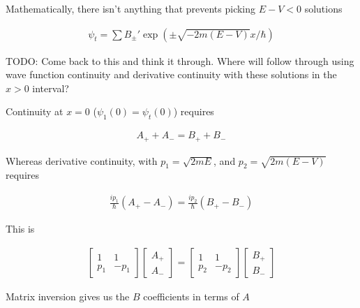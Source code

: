 \documentclass{article}
\begin{document}
Mathematically, there isn't anything that prevents picking $E-V <0$ solutions

\begin{align*}
\psi_t = \sum B_{\pm}' \exp\left( \pm \sqrt{-2m(E-V)} x / \hbar \right)
\end{align*}

TODO: Come back to this and think it through.  Where will follow through using
wave function continuity and derivative continuity with these solutions
in the $x>0$ interval?

Continuity at $x=0$ ($\psi_1(0) = \psi_t(0)$) requires

\begin{align*}
A_{+} + A_{-} = B_{+} + B_{-}
\end{align*}

Whereas derivative continuity, with $p_1 = \sqrt{2mE}$, and $p_2 = \sqrt{2m (E-V)}$ requires

\begin{align*}
\frac{i p_1}{\hbar} (A_{+} - A_{-}) = \frac{i p_2}{\hbar} (B_{+} - B_{-}) 
\end{align*}

This is

\begin{align*}
\begin{bmatrix}
1 & 1 \\
p_1 & -p_1
\end{bmatrix}
\begin{bmatrix}
A_{+} \\
A_{-} 
\end{bmatrix}
=
\begin{bmatrix}
1 & 1 \\
p_2 & -p_2
\end{bmatrix}
\begin{bmatrix}
B_{+} \\
B_{-} 
\end{bmatrix}
\end{align*}

Matrix inversion gives us the $B$ coefficients in terms of $A$
\end{document}
